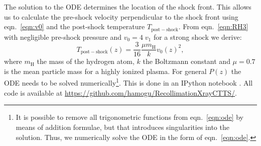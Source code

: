 The solution to the ODE determines the location of the shock front. This allows us to calculate the pre-shock velocity perpendicular to the shock front using eqn.~\ref{eqn:v0} and the post-shock temperature $T_{\mathrm{post-shock}}$. From eqn.~\ref{eqn:RH3} with negligible pre-shock pressure and $v_0=4\;v_1$ for a strong shock we derive:
\begin{equation}
T_{\mathrm{post-shock}}(z) = \frac{3}{16} \frac{\mu m_{\textrm{H}}}{k} v_0(z)^2,\label{eqn:T}
\end{equation}
where $m_{\textrm{H}}$ the mass of the hydrogen atom, $k$ the Boltzmann constant and $\mu=0.7$ is the mean particle mass for a highly ionized plasma. For general $P(z)$ the ODE needs to be solved numerically\footnote{It is possible to remove all trigonometric functions from eqn.~\ref{eqn:ode} by means of addition formulae, but that introduces singularities into the solution. Thus, we numerically solve the ODE in the form of eqn.~\ref{eqn:ode}.}. This is done in an IPython notebook \citep{PER-GRA:2007}. All code is available at \url{https://github.com/hamogu/RecollimationXrayCTTS/}.
